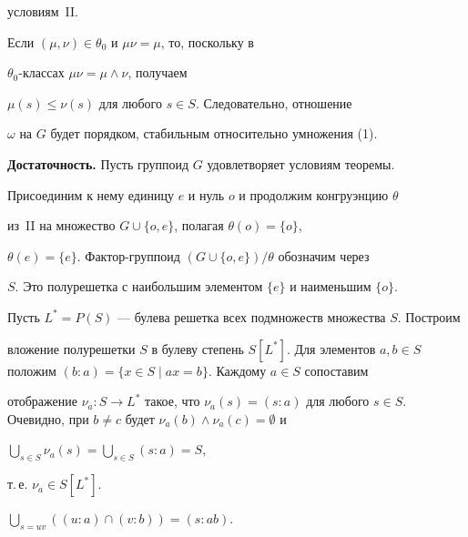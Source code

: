 условиям~II.





Если $(\mu,\nu)\in\theta_0$ и $\mu\nu=\mu$, то, поскольку в


$\theta_0$-классах $\mu\nu=\mu\wedge\nu$, получаем


$\mu(s)\leqslant\nu(s)$ для любого $s\in S$. Следовательно, отношение


$\omega$ на $G$ будет порядком, стабильным относительно умножения (1).


\medskip





{\bf Достаточность.} Пусть группоид $G$ удовлетворяет условиям теоремы.


Присоединим к нему единицу $e$ и нуль $o$ и продолжим конгруэнцию $\theta$


из~II на множество $G\cup\{o,e\}$, полагая $\theta(o)=\{o\}$,


$\theta(e)=\{e\}$. Фактор-группоид $(G\cup\{o,e\})/\theta$ обозначим через


$S$. Это полурешетка с наибольшим элементом $\{e\}$ и наименьшим $\{o\}$.





Пусть $L^*=P(S)$ --- булева решетка всех подмножеств множества $S$. Построим


вложение полурешетки $S$ в булеву степень $S[L^*]$. Для элементов $a,b\in


S$ положим $(b:a)=\{x\in S\mid ax=b\}$. Каждому $a\in S$ сопоставим


отображение $\nu_a: S\to L^*$ такое, что $\nu_a(s)=(s:a)$ для любого $s\in


S$. Очевидно, при $b\ne c$ будет $\nu_a(b)\wedge\nu_a(c)=\emptyset$ и


$\bigcup\limits_{s\in S}\nu_a(s)=\bigcup\limits_{s\in S} (s:a)=S$,


т.\,е. $\nu_a\in S[L^*]$.





\begin{lem}


$\bigcup\limits_{s=uv}((u:a)\cap(v:b))=(s:ab)$.


\end{lem}





